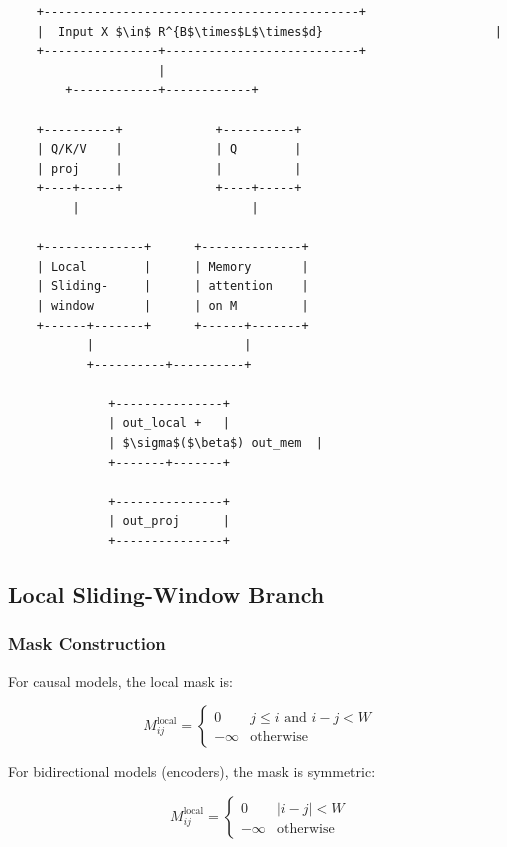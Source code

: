 \begin{lstlisting}
    +--------------------------------------------+
    |  Input X $\in$ R^{B$\times$L$\times$d}                        |
    +----------------+---------------------------+
                     |
        +------------+------------+
                                   
    +----------+             +----------+
    | Q/K/V    |             | Q        |
    | proj     |             |          |
    +----+-----+             +----+-----+
         |                        |
                                   
    +--------------+      +--------------+
    | Local        |      | Memory       |
    | Sliding-     |      | attention    |
    | window       |      | on M         |
    +------+-------+      +------+-------+
           |                     |
           +----------+----------+
                       
              +---------------+
              | out_local +   |
              | $\sigma$($\beta$) out_mem  |
              +-------+-------+
                       
              +---------------+
              | out_proj      |
              +---------------+
\end{lstlisting}

\subsection{Local Sliding-Window Branch}

\subsubsection{Mask Construction}

For causal models, the local mask is:

\[
M_{ij}^\text{local} = \begin{cases} 0 & j \leq i \text{ and } i - j < W \\ -\infty & \text{otherwise} \end{cases}
\tag{4.1}
\]

For bidirectional models (encoders), the mask is symmetric:

\[
M_{ij}^\text{local} = \begin{cases} 0 & |i - j| < W \\ -\infty & \text{otherwise} \end{cases}
\tag{4.2}
\]

